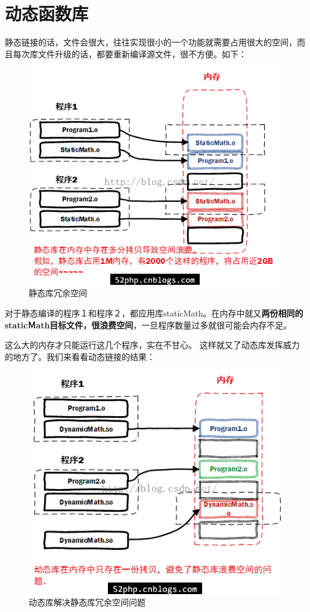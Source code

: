 \documentclass[UTF8,a4paper,12pt]{ctexbook}
\begin{document}
	\section{动态函数库}
		静态链接的话，文件会很大，往往实现很小的一个功能就需要占用很大的空间，而且每次库文件升级的话，都要重新编译源文件，很不方便。如下：
		\begin{figure}[H]
			\centering
			\includegraphics[scale = 0.7]{figure/staticLib-disAdvantage.png}
			\caption{静态库冗余空间}
		\end{figure}
		
		对于静态编译的程序１和程序２，都应用库staticMath。在内存中就又\textbf{两份相同的staticＭath目标文件，很浪费空间}，一旦程序数量过多就很可能会内存不足。
		
		这么大的内存才只能运行这几个程序，实在不甘心。
		这样就又了动态库发挥威力的地方了。我们来看看动态链接的结果：
		
		\begin{figure}[H]
			\centering
			\includegraphics[scale = 0.7]{figure/dynamicLib.png}
			\caption{动态库解决静态库冗余空间问题}
		\end{figure}
\end{document}
